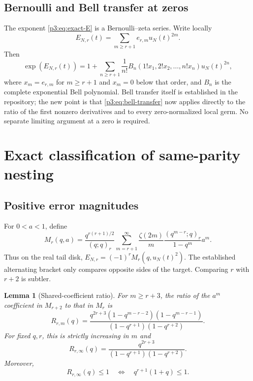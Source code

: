 \documentclass[11pt]{article}
\numberwithin{equation}{section}
\newtheorem{lemma}[theorem]{Lemma}
\theoremstyle{definition}
\theoremstyle{remark}
\begin{document}
\subsection{Bernoulli and Bell transfer at zeros}

The exponent \eqref{p3:eq:exact-E} is a Bernoulli--zeta series.  Write locally
\[
 E_{N,r}(t)=\sum_{m\ge r+1}e_{r,m}u_N(t)^{2m}.
\]
Then
\begin{equation}
 \exp(E_{N,r}(t))
 =1+\sum_{n\ge r+1}\frac{1}{n!}
 B_n(1!x_1,2!x_2,\ldots,n!x_n)u_N(t)^{2n},
 \label{p3:eq:bell-transfer}
\end{equation}
where $x_m=e_{r,m}$ for $m\ge r+1$ and $x_m=0$ below that order, and $B_n$ is the complete
exponential Bell polynomial.  Bell transfer itself is established in the repository; the new
point is that \eqref{p3:eq:bell-transfer} now applies directly to the ratio of the first nonzero
derivatives and to every zero-normalized local germ.  No separate limiting argument at a zero
is required.

\section{Exact classification of same-parity nesting}\label{p3:sec:nesting}

\subsection{Positive error magnitudes}

For $0<a<1$, define
\begin{equation}
 M_r(q,a)=\frac{q^{r(r+1)/2}}{(q;q)_r}
 \sum_{m=r+1}^{\infty}\frac{\zeta(2m)}{m}
 \frac{(q^{m-r};q)_r}{1-q^m}a^m.
 \label{p3:eq:Mr}
\end{equation}
Thus on the real tail disk, $E_{N,r}=(-1)^rM_r(q,u_N(t)^2)$.  The established alternating
bracket only compares opposite sides of the target.  Comparing $r$ with $r+2$ is subtler.

\begin{lemma}[Shared-coefficient ratio]\label{p3:lem:coefficient-ratio}
For $m\ge r+3$, the ratio of the $a^m$ coefficient in $M_{r+2}$ to that in $M_r$ is
\begin{equation}
 R_{r,m}(q)=
 \frac{q^{2r+3}(1-q^{m-r-2})(1-q^{m-r-1})}
 {(1-q^{r+1})(1-q^{r+2})}.
 \label{p3:eq:Rrm}
\end{equation}
For fixed $q,r$, this is strictly increasing in $m$ and
\begin{equation}
 R_{r,\infty}(q)=
 \frac{q^{2r+3}}{(1-q^{r+1})(1-q^{r+2})}.
 \label{p3:eq:Rinfty}
\end{equation}
Moreover,
\begin{equation}
 R_{r,\infty}(q)\le1
 \quad\Longleftrightarrow\quad q^{r+1}(1+q)\le1.
 \label{p3:eq:threshold-equivalence}
\end{equation}
\end{lemma}
\end{document}
